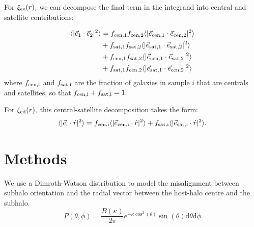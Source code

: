 \documentclass[fleqn,usenatbib]{mnras}
\newcommand{\tpcf}[1]{\xi_{\rm #1}}
\newcommand{\evec}[1]{\vec{e}_{\rm #1}}
\newcommand{\evechat}[1]{\hat{e}_{\rm #1}}
\newcommand{\mean}[1]{\langle #1 \rangle}
\begin{document}
For $\tpcf{ee}(r),$ we can decompose the final term in the integrand into central and satellite contributions:

\begin{align}
\begin{split}
\mean{\vert\evec{1}\cdot\evec{2}\vert^{2}} &= 
f_{\rm cen, 1}f_{\rm cen, 2}\mean{\vert\evec{cen, 1}\cdot\evec{cen, 2}\vert^{2}} \\
& + f_{\rm sat, 1}f_{\rm sat, 2}\mean{\vert\evec{sat, 1}\cdot\evec{sat, 2}\vert^{2}} \\
&+ f_{\rm cen, 1}f_{\rm sat, 2}\mean{\vert\evec{cen, 1}\cdot\evec{sat, 2}\vert^{2}} \\
& + f_{\rm sat, 1}f_{\rm cen, 2}\mean{\vert\evec{sat, 1}\cdot\evec{cen, 2}\vert^{2}}  
\end{split}
\end{align}
where $f_{\rm cen, i}$ and $f_{\rm sat, i}$ are the fraction of galaxies in sample $i$ that are centrals and satellites, so that $f_{\rm cen, i} + f_{\rm sat, i}=1.$ 

For $\tpcf{ed}(r),$ this central-satellite decomposition takes the form:
\begin{align}
\begin{split}
 \mean{\vert\evec{i}\cdot\hat{r}\vert^{2}} =   f_{\rm cen, i}\mean{\vert\evec{cen, i}\cdot\hat{r}\vert^{2}} +  f_{\rm sat, i}\mean{\vert\evec{sat, i}\cdot\hat{r}\vert^{2}}.
\end{split}
\end{align}




\section{Methods}

We use a Dimroth-Watson distribution to model the misalignment between subhalo orientation and the radial vector between the host-halo centre and the subhalo.   
\begin{equation}
P(\theta,\phi) = \frac{B(\kappa)}{2\pi}e^{-\kappa\cos^2(\theta)}\sin(\theta)\mathrm{d}\theta\mathrm{d}\phi
\label{eq:watson}
\end{equation}
\end{document}
